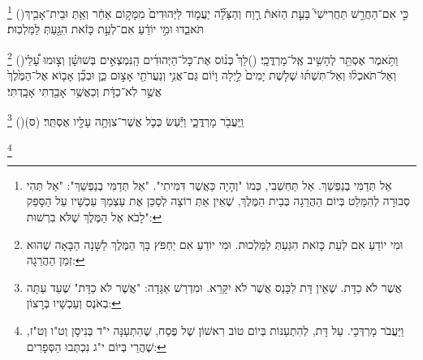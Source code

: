 \documentclass[12pt, openany]{book}
\newcommand{\footnotecomment}[1]{
	\renewcommand\thefootnote{}
	\footnote{#1}}
\newcommand{\commenta}[1]{\footnotecomment{#1}\hspace{0em}}
\newcommand{\vsnum}[1]{(\hebrewnumeral{#1})\space}
\begin{document}
{\commenta{אַל תְּדַמִּי בְנַפְשֵׁךְ. אַל תַּחְשְׁבִי, כְּמוֹ "וְהָיָה כַּאֲשֶׁר דִּמִּיתִי". "אַל תְּדַמִּי בְנַפְשֵׁךְ": "אַל תְּהִי סְבוּרָה לְהִמָּלֵט בְּיוֹם הַהֲרֵגָה בְּבֵית הַמֶּלֶךְ, שֶׁאֵין אַתְּ רוֹצָה לְסַכֵּן אֶת עַצְמֵךְ עַכְשָׁיו עַל הַסָּפֵק לָבֹא אֶל הַמֶּלֶךְ שֶׁלֹּא בִרְשׁוּת": }%
\vsnum{14}כִּ֣י אִם־הַחֲרֵ֣שׁ תַּחֲרִישִׁי֮ בָּעֵ֣ת הַזֹּאת֒ רֶ֣וַח וְהַצָּלָ֞ה יַעֲמ֤וֹד לַיְּהוּדִים֙ מִמָּק֣וֹם אַחֵ֔ר וְאַ֥תְּ וּבֵית־אָבִ֖יךְ תֹּאבֵ֑דוּ וּמִ֣י יוֹדֵ֔עַ אִם־לְעֵ֣ת כָּזֹ֔את הִגַּ֖עַתְּ לַמַּלְכֽוּת׃%
\commenta{וּמִי יוֹדֵעַ אִם לְעֵת כָּזֹאת הִגַּעַתְּ לַמַּלְכוּת. וּמִי יוֹדֵעַ אִם יַחְפֹּץ בָּךְ הַמֶּלֶךְ לַשָּׁנָה הַבָּאָה שֶׁהוּא זְמַן הַהֲרֵגָה:}%
\vsnum{15}וַתֹּ֥אמֶר אֶסְתֵּ֖ר לְהָשִׁ֥יב אֶֽל־מָרְדֳּכָֽי׃
\vsnum{16}לֵךְ֩ כְּנ֨וֹס אֶת־כָּל־הַיְּהוּדִ֜ים הַֽנִּמְצְאִ֣ים בְּשׁוּשָׁ֗ן וְצ֣וּמוּ עָ֠לַי וְאַל־תֹּאכְל֨וּ וְאַל־תִּשְׁתּ֜וּ שְׁלֹ֤שֶׁת יָמִים֙ לַ֣יְלָה וָי֔וֹם גַּם־אֲנִ֥י וְנַעֲרֹתַ֖י אָצ֣וּם כֵּ֑ן וּבְכֵ֞ן אָב֤וֹא אֶל־הַמֶּ֙לֶךְ֙ אֲשֶׁ֣ר לֹֽא־כַדָּ֔ת וְכַאֲשֶׁ֥ר אָבַ֖דְתִּי אָבָֽדְתִּי׃%
\commenta{אֲשֶׁר לֹא כַדָּת. שֶׁאֵין דָּת לִכָּנֵס אֲשֶׁר לֹא יִקָּרֵא. וּמִדְרַשׁ אַגָּדָה: "אֲשֶׁר לֹא כַדָּת" שֶׁעַד עַתָּה בְאֹנֶס וְעַכְשָׁיו בְּרָצוֹן: }%
\vsnum{17}וַֽיַּעֲבֹ֖ר מָרְדֳּכָ֑י וַיַּ֕עַשׂ כְּכֹ֛ל אֲשֶׁר־צִוְּתָ֥ה עָלָ֖יו אֶסְתֵּֽר׃ (ס)%
\commenta{וַיַּעֲבֹר מָרְדְּכָי. עַל דָּת, לְהִתְעַנּוֹת בְּיוֹם טוֹב רִאשׁוֹן שֶׁל פֶּסַח, שֶׁהִתְעַנָּה י"ד בְּנִיסָן וְט"ו וְט"ז, שֶׁהֲרֵי בְּיוֹם י"ג נִכְתְּבוּ הַסְּפָרִים: }%
\clearpage}
\end{document}
